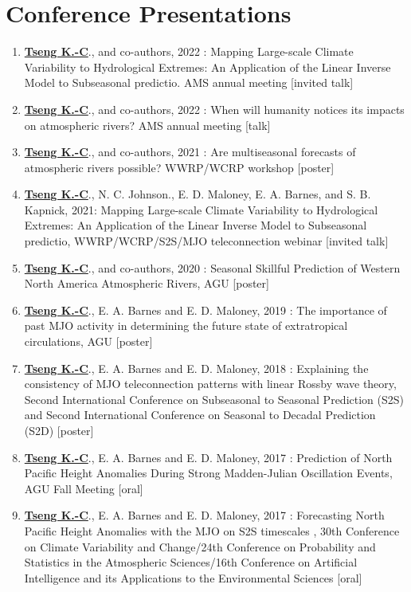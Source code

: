 \documentclass{article}
\begin{document}
\section{\color{airforceblue}Conference Presentations}
\begin{enumerate} 
	\item \normalsize{\bf{\underline{Tseng K.-C}}}., and co-authors, 2022 : Mapping Large-scale Climate Variability to Hydrological Extremes: An Application of the Linear Inverse Model to Subseasonal predictio. AMS annual meeting [invited talk]
	\item \normalsize{\bf{\underline{Tseng K.-C}}}., and co-authors, 2022 : When will humanity notices its impacts on atmospheric rivers? AMS annual meeting [talk]
	\item \normalsize{\bf{\underline{Tseng K.-C}}}., and co-authors, 2021 : Are multiseasonal forecasts of atmospheric rivers possible? WWRP/WCRP workshop [poster]
	\item \normalsize{\bf{\underline{Tseng K.-C}}}., N. C. Johnson., E. D. Maloney, E. A. Barnes, and S. B. Kapnick, 2021: Mapping Large-scale Climate Variability to Hydrological Extremes: An Application of the Linear Inverse Model to Subseasonal predictio, WWRP/WCRP/S2S/MJO teleconnection webinar [invited talk]
	\item \normalsize{\bf{\underline{Tseng K.-C}}}., and co-authors, 2020 : Seasonal Skillful Prediction of Western North America Atmospheric Rivers, AGU [poster]
	\item \normalsize{\bf{\underline{Tseng K.-C}}}., E. A. Barnes and E. D. Maloney, 2019 : The importance of past MJO activity in determining the future state of extratropical circulations, AGU [poster]
	\item \normalsize{\bf{\underline{Tseng K.-C}}}., E. A. Barnes and E. D. Maloney, 2018 : Explaining the consistency of MJO teleconnection patterns with linear Rossby wave theory, Second International Conference on Subseasonal to Seasonal Prediction (S2S) and Second International Conference on Seasonal to Decadal Prediction (S2D) [poster]
	\item \normalsize{\bf{\underline{Tseng K.-C}}}., E. A. Barnes and E. D. Maloney, 2017 : Prediction of North Pacific Height Anomalies During Strong Madden-Julian Oscillation Events, AGU Fall Meeting [oral]
	\item \normalsize{\bf{\underline{Tseng K.-C}}}., E. A. Barnes and E. D. Maloney, 2017 : Forecasting North Pacific Height Anomalies with the MJO on S2S timescales , 30th Conference on Climate Variability and Change/24th Conference on Probability and Statistics in the Atmospheric Sciences/16th Conference on Artificial Intelligence and its Applications to the Environmental Sciences [oral] 

\end{enumerate}
\end{document}
